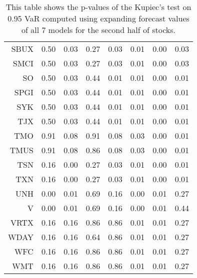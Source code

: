 \begin{table}[ht]
\begin{tabular}{rrrrrrrr}
  SBUX & 0.50 & 0.03 & 0.27 & 0.03 & 0.01 & 0.00 & 0.03 \\ 
  SMCI & 0.50 & 0.03 & 0.27 & 0.03 & 0.01 & 0.00 & 0.03 \\ 
  SO & 0.50 & 0.03 & 0.44 & 0.01 & 0.01 & 0.00 & 0.01 \\ 
  SPGI & 0.50 & 0.03 & 0.44 & 0.01 & 0.01 & 0.00 & 0.01 \\ 
  SYK & 0.50 & 0.03 & 0.44 & 0.01 & 0.01 & 0.00 & 0.01 \\ 
  TJX & 0.50 & 0.03 & 0.44 & 0.01 & 0.01 & 0.00 & 0.01 \\ 
  TMO & 0.91 & 0.08 & 0.91 & 0.08 & 0.03 & 0.00 & 0.01 \\ 
  TMUS & 0.91 & 0.08 & 0.86 & 0.08 & 0.03 & 0.00 & 0.01 \\ 
  TSN & 0.16 & 0.00 & 0.27 & 0.03 & 0.01 & 0.00 & 0.01 \\ 
  TXN & 0.16 & 0.00 & 0.27 & 0.03 & 0.01 & 0.00 & 0.01 \\ 
  UNH & 0.00 & 0.01 & 0.69 & 0.16 & 0.00 & 0.01 & 0.27 \\ 
  V & 0.00 & 0.01 & 0.69 & 0.16 & 0.00 & 0.01 & 0.44 \\ 
  VRTX & 0.16 & 0.16 & 0.86 & 0.86 & 0.01 & 0.01 & 0.27 \\ 
  WDAY & 0.16 & 0.16 & 0.64 & 0.86 & 0.01 & 0.01 & 0.27 \\ 
  WFC & 0.16 & 0.16 & 0.86 & 0.86 & 0.01 & 0.01 & 0.27 \\ 
  WMT & 0.16 & 0.16 & 0.86 & 0.86 & 0.01 & 0.01 & 0.27 \\ 
   \hline
\end{tabular}
\caption[Kupiec's test p-values, alpha =0.95 (2)]{This table shows the p-values of the Kupiec's test on 0.95 VaR computed using expanding forecast values of all 7 models for the second half of stocks.} 
\label{Table:Kupiec_test_expanding_0.95_2}
\end{table}
